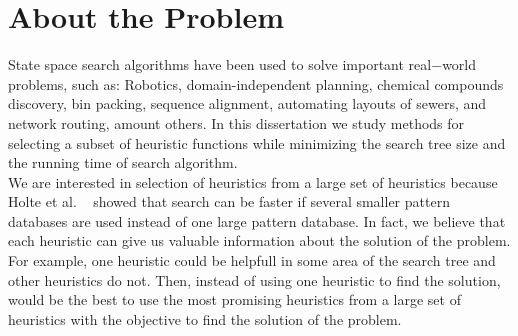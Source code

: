 

\chapter{About the Problem}\label{aboutTheProblem}

\iffalse
\chapterprecis{The purpose of this section if to motivate the problem.}\index{sinopse de capítulo}
\fi

State space search algorithms have been used to solve important real$-$world problems, such as: Robotics, domain-independent planning, chemical compounds discovery, bin packing, sequence alignment, automating layouts of sewers, and network routing, amount others. In this dissertation we study methods for selecting a subset of heuristic functions while minimizing the search tree size and the running time of search algorithm.\\

We are interested in selection of heuristics from a large set of heuristics because Holte et al. ~\cite{holte2006maximizing} showed that search can be faster if several smaller pattern databases are used instead of one large pattern database. In fact, we believe that each heuristic can give us valuable information about the solution of the problem. For example, one heuristic could be helpfull in some area of the search tree and other heuristics do not. Then, instead of using one heuristic to find the solution, would be the best to use the most promising heuristics from a large set of heuristics with the objective to find the solution of the problem.\\

